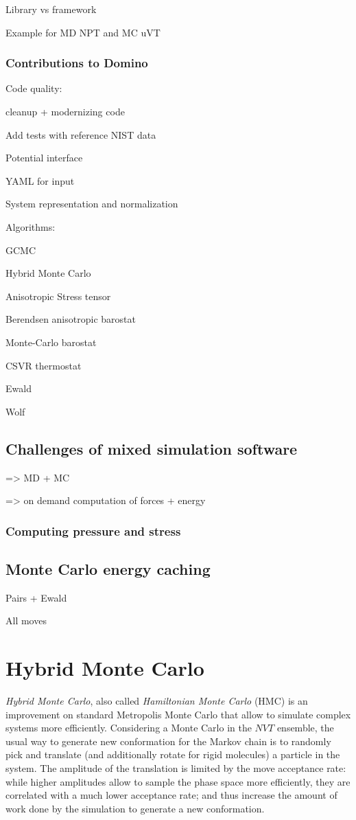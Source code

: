 \documentclass[thesis]{subfiles}
\begin{document}
Library vs framework

Example for MD NPT and MC uVT

\subsubsection{Contributions to Domino}

Code quality:

cleanup + modernizing code

Add tests with reference NIST data

Potential interface

YAML for input

System representation and normalization



Algorithms:

GCMC

Hybrid Monte Carlo

Anisotropic Stress tensor

Berendsen anisotropic barostat

Monte-Carlo barostat

CSVR thermostat

Ewald

Wolf

\subsection{Challenges of mixed simulation software}

=> MD + MC

=> on demand computation of forces + energy

\subsubsection{Computing pressure and stress}

\subsection{Monte Carlo energy caching}

Pairs + Ewald

All moves


\newpage
\section{Hybrid Monte Carlo}
\label{sec:hmc}

\emph{Hybrid Monte Carlo}, also called \emph{Hamiltonian Monte Carlo} (HMC) is
an improvement on standard Metropolis Monte Carlo that allow to simulate complex
systems more efficiently. Considering a Monte Carlo in the $NVT$ ensemble, the
usual way to generate new conformation for the Markov chain is to randomly pick
and translate (and additionally rotate for rigid molecules) a particle in the
system. The amplitude of the translation is limited by the move acceptance rate:
while higher amplitudes allow to sample the phase space more efficiently, they
are correlated with a much lower acceptance rate; and thus increase the amount
of work done by the simulation to generate a new conformation.
\end{document}
